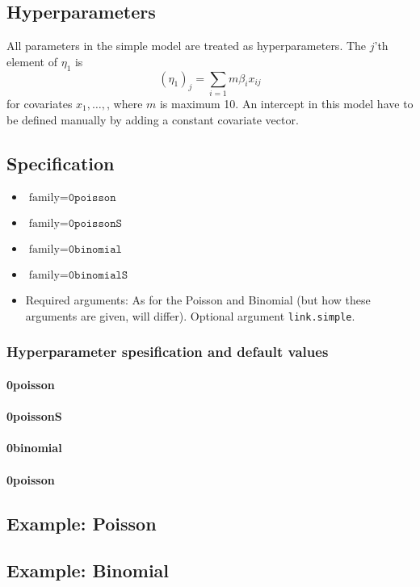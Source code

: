 \documentclass[a4paper,11pt]{article}
\begin{document}
\subsection*{Hyperparameters}

All parameters in the simple model are treated as hyperparameters.
The $j$'th element of $\eta_1$ is
\begin{displaymath}
    (\eta_1)_j = \sum_{i=1}{m} \beta_i x_{ij}
\end{displaymath}
for covariates $x_1, \ldots, $, where $m$ is maximum 10. An intercept
in this model have to be defined manually by adding a constant
covariate vector.

\subsection*{Specification}

\begin{itemize}
\item $\text{family}=\texttt{0poisson}$
\item $\text{family}=\texttt{0poissonS}$
\item $\text{family}=\texttt{0binomial}$
\item $\text{family}=\texttt{0binomialS}$
\item Required arguments: As for the Poisson and Binomial (but how
    these arguments are given, will differ). Optional argument
    \texttt{link.simple}.
\end{itemize}

\subsubsection*{Hyperparameter spesification and default values}
\paragraph{0poisson}
{\small }
\paragraph{0poissonS}
{\small }
\paragraph{0binomial}
{\small }
\paragraph{0poisson}
{\small }


\clearpage
\subsection*{Example: Poisson}
{\small }

\clearpage
\subsection*{Example: Binomial}
{\small }
\end{document}

